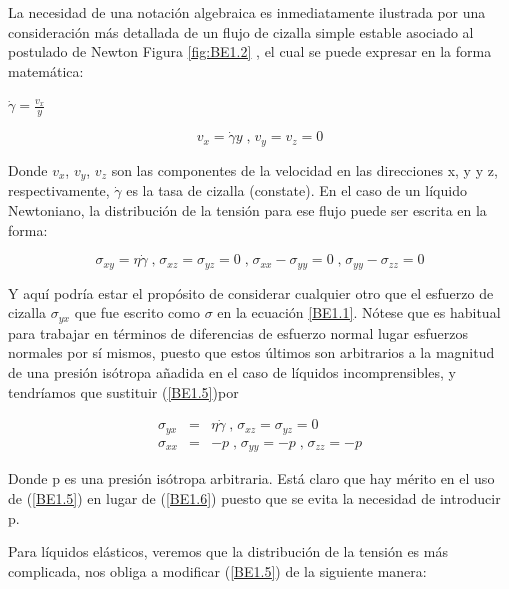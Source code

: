 \documentclass[review]{elsarticle}
\begin{document}
La necesidad de una notaci\'on algebraica es inmediatamente ilustrada por una consideraci\'on m\'as detallada de un flujo
de cizalla simple estable asociado al postulado de Newton Figura \ref{fig:BE1.2} , el cual se puede expresar en la forma
matem\'atica:

$\dot{\gamma } =\frac{v_{x}}{y}$

\begin{equation}v_{x} =\dot{\gamma } y\;\text{,}\;v_{y} =v_{z} =0 \label{BE1.4}
\end{equation}\qquad \qquad \qquad \qquad \qquad \qquad \qquad \qquad

Donde $v_{x}$, $v_{y}$, $v_{z}$ son las componentes de la velocidad en las direcciones x, y y z, respectivamente, $\dot{\gamma }$ es la tasa de cizalla (constate). En el caso de un l\'iquido Newtoniano, la distribuci\'on de la tensi\'on para ese flujo
puede ser escrita en la forma:

\begin{equation}\sigma _{x y} =\eta  \dot{\gamma }\;\text{,}\;\sigma _{x z} =\sigma _{y z} =0\;\text{,}\;\sigma _{x x} -\sigma _{y y} =0\;\text{,}\;\sigma _{y y} -\sigma _{z z} =0 \label{BE1.5}
\end{equation}\qquad \qquad \qquad

Y aqu\'i podr\'ia estar el prop\'osito de considerar cualquier otro que el esfuerzo de cizalla $\sigma _{y x}$ que fue escrito como $\sigma $ en la ecuaci\'on \ref{BE1.1}. N\'otese que es habitual para trabajar en t\'erminos de diferencias de esfuerzo normal lugar esfuerzos normales por s\'i mismos, puesto que estos \'ultimos son arbitrarios a la magnitud de una presi\'on is\'otropa a{\~n}adida en el caso de l\'iquidos incomprensibles, y tendr\'iamos que sustituir (\ref{BE1.5})por

\begin{eqnarray}\sigma _{y x} &  = & \eta  \dot{\gamma }\;\text{,}\;\sigma _{x z} =\sigma _{y z} =0 \label{BE1.6} \\
\sigma _{x x} &  = &  -p\;\text{,}\;\sigma _{y y} = -p\;\text{,}\;\sigma _{z z} = -p \nonumber \end{eqnarray}

Donde p es una presi\'on is\'otropa arbitraria. Est\'a claro que hay m\'erito en el
uso de (\ref{BE1.5}) en lugar de (\ref{BE1.6}) puesto que se evita la necesidad de
introducir p.

Para l\'iquidos el\'asticos, veremos que la distribuci\'on de la tensi\'on es m\'as complicada, nos obliga
a modificar (\ref{BE1.5}) de la siguiente manera:
\end{document}
